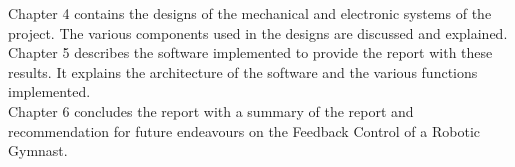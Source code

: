 Chapter 4 contains the designs of the mechanical and electronic systems of the project. The various components used in the designs are discussed and explained.\\

Chapter 5 describes the software implemented to provide the report with these results. It explains the architecture of the software and the various functions implemented.\\

Chapter 6 concludes the report with a summary of the report and recommendation for future endeavours on the Feedback Control of a Robotic Gymnast. 

 
